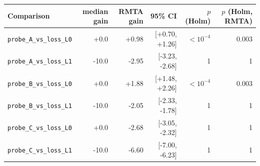 \begin{tabular}{lrrrrr}
\toprule
Comparison & median gain & RMTA gain & 95\% CI & $p$ (Holm) & $p$ (Holm, RMTA) \\
\midrule
\texttt{probe\_A\_vs\_loss\_L0} & +0.0 & +0.98 & [+0.70, +1.26] & $<10^{-4}$ & 0.003 \\
\texttt{probe\_A\_vs\_loss\_L1} & -10.0 & -2.95 & [-3.23, -2.68] & 1 & 1 \\
\texttt{probe\_B\_vs\_loss\_L0} & +0.0 & +1.88 & [+1.48, +2.26] & $<10^{-4}$ & 0.003 \\
\texttt{probe\_B\_vs\_loss\_L1} & -10.0 & -2.05 & [-2.33, -1.78] & 1 & 1 \\
\texttt{probe\_C\_vs\_loss\_L0} & +0.0 & -2.68 & [-3.05, -2.32] & 1 & 1 \\
\texttt{probe\_C\_vs\_loss\_L1} & -10.0 & -6.60 & [-7.00, -6.23] & 1 & 1 \\
\bottomrule
\end{tabular}
